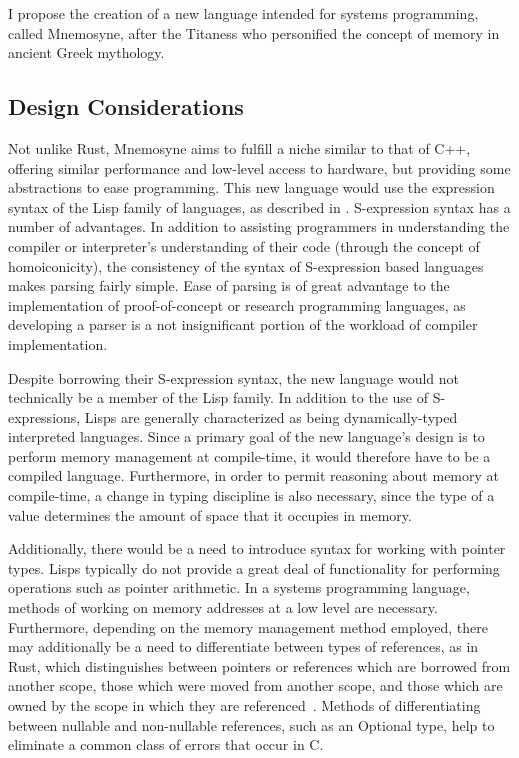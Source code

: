\documentclass[11pt]{article}
\theoremstyle{break}
\begin{document}
I propose the creation of a new language intended for systems programming, called Mnemosyne, after the Titaness who personified the concept of memory in ancient Greek mythology.

\subsection{Design Considerations}

Not unlike Rust, Mnemosyne aims to fulfill a niche similar to that of C++, offering similar performance and low-level access to hardware, but providing some abstractions to ease programming. This new language would use the expression syntax of the Lisp family of languages, as described in . S-expression syntax has a number of advantages. In addition to assisting programmers in understanding the compiler or interpreter's understanding of their code (through the concept of homoiconicity), the consistency of the syntax of S-expression based languages makes parsing fairly simple. Ease of parsing is of great advantage to the implementation of proof-of-concept or research programming languages, as developing a parser is a not insignificant portion of the workload of compiler implementation.

Despite borrowing their S-expression syntax, the new language would not technically be a member of the Lisp family. In addition to the use of S-expressions, Lisps are generally characterized as being dynamically-typed interpreted languages. Since a primary goal of the new language's design is to perform memory management at compile-time, it would therefore have to be a compiled language. Furthermore, in order to permit reasoning about memory at compile-time, a change in typing discipline is also necessary, since the type of a value determines the amount of space that it occupies in memory.

Additionally, there would be a need to introduce syntax for working with pointer types. Lisps typically do not provide a great deal of functionality for performing operations such as pointer arithmetic. In a systems programming language, methods of working on memory addresses at a low level are necessary. Furthermore, depending on the memory management method employed, there may additionally be a need to differentiate between types of references, as in Rust, which distinguishes between pointers or references which are borrowed from another scope, those which were moved from another scope, and those which are owned by the scope in which they are referenced~\cite{Matsakis:2014:RL:2663171.2663188}. Methods of differentiating between nullable and non-nullable references, such as an Optional type, help to eliminate a common class of errors that occur in C.
\end{document}
